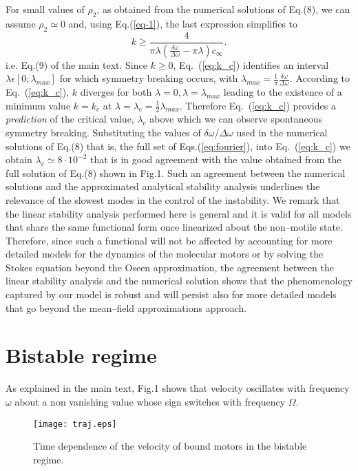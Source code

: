 \documentclass[prl,aps,twocolumn, floatfix, superscriptaddress,showpacs]{revtex4}
\begin{document}
\begin{widetext}
\begin{equation}
\label{necess-cond-gamma-1}
\end{equation}
For small values of $\rho_2$, as obtained from the numerical solutions of Eq.(8), we can assume  $\rho_2\simeq 0$ and, using Eq.(\ref{eq-1}), the last expression simplifies to
\begin{equation}
k\geq\frac{4}{\pi\lambda\left(\frac{\delta\omega}{\Delta\omega}-\pi\lambda\right)c_\infty}.
\label{eq:k_c}
\end{equation}
i.e. Eq.(9) of the main text.
Since $k\ge0$, Eq.~(\ref{eq:k_c}) identifies an interval $\lambda \epsilon [0;\lambda_{max}]$ for which symmetry breaking occurs, with $\lambda_{max}= \frac{1}{\pi}\frac{\delta \omega}{\Delta \omega}$.
According to Eq.~(\ref{eq:k_c}), $k$ diverges for both $\lambda=0,\lambda=\lambda_{max}$ leading to the existence of a minimum value $k=k_c$ at $\lambda=\lambda_c=\frac{1}{2}\lambda_{max}$.
Therefore Eq.~(\ref{eq:k_c}) provides a \textit{prediction} of the critical value, $\lambda_c$ above which we can observe spontaneous symmetry breaking. Substituting the values of $\delta \omega/\Delta \omega$ used in the numerical solutions of Eq.(8) that is, the full set of Eqs.(\ref{eq:fourier}), into Eq.~(\ref{eq:k_c}) we obtain $\lambda_c\simeq 8\cdot 10^{-2}$ that is in good agreement with the value obtained from the full solution of Eq.(8) shown in Fig.1. Such an agreement between the numerical solutions and the approximated analytical stability analysis underlines the relevance of the slowest modes in the control of the instability. We remark that the linear stability analysis performed here is general and it is valid for all models that share the same functional form once linearized about the non--motile state. 
Therefore, since such a functional will not be affected by accounting for more detailed models for the dynamics of the molecular motors or by solving the Stokes equation beyond the Oseen approximation, the agreement between the linear stability analysis and the numerical solution shows that the phenomenology captured by our model is robust and will persist also for more detailed models that go beyond the mean--field approximations approach. 
\newpage
\section{Bistable regime}

As explained in the main text, Fig.1 shows that velocity oscillates with frequency $\omega$ about a non vanishing value whose sign switches with frequency $\Omega$.
\begin{figure}[h!]
\centering
 \texttt{[image: traj.eps]}
 \caption{Time dependence of the velocity of bound motors in the bistable regime.}
\end{figure}



\end{widetext}
\end{document}
